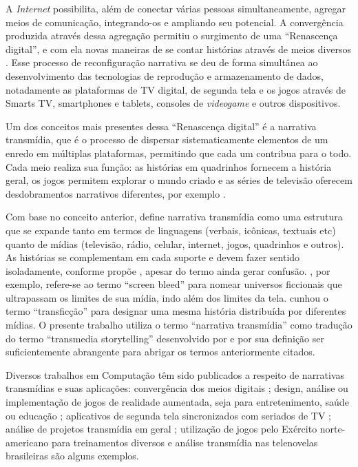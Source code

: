 \documentclass[
article,			%
11pt,				%
oneside,			%
a4paper,			%
english,			%
brazil,				%
sumario=tradicional
]{abntex2}
\begin{document}
  A \textit{Internet} possibilita, além de conectar várias pessoas simultaneamente, agregar meios de comunicação, integrando-os e ampliando seu potencial. A convergência produzida através dessa agregação permitiu o surgimento de uma ``Renascença digital'', e com ela novas maneiras de se contar histórias através de meios diversos \cite{jenkins_2001}. Esse processo de reconfiguração narrativa se deu de forma simultânea ao desenvolvimento das tecnologias de reprodução e armazenamento de dados, notadamente as plataformas de TV digital, de segunda tela e os jogos através de Smarts TV, smartphones e tablets, consoles de \textit{videogame} e outros dispositivos.

  Um dos conceitos mais presentes dessa ``Renascença digital'' é a narrativa transmídia, que é o processo de dispersar sistematicamente elementos de um enredo em múltiplas plataformas, permitindo que cada um contribua para o todo. Cada meio realiza sua função: as histórias em quadrinhos fornecem a história geral, os jogos permitem explorar o mundo criado e as séries de televisão oferecem desdobramentos narrativos diferentes, por exemplo \cite{jenkins_fastcompany_2011}.

  Com base no conceito anterior,  define narrativa transmídia como uma estrutura que se expande tanto em termos de linguagens (verbais, icônicas, textuais etc) quanto de mídias (televisão, rádio, celular, internet, jogos, quadrinhos e outros). As histórias se complementam em cada suporte e devem fazer sentido isoladamente, conforme propõe , apesar do termo ainda gerar confusão. , por exemplo, refere-se ao termo ``screen bleed'' para nomear universos ficcionais que ultrapassam os limites de sua mídia, indo além dos limites da tela.  cunhou o termo ``transficção''  para  designar  uma  mesma  história  distribuída  por  diferentes  mídias. O presente trabalho utiliza o termo ``narrativa transmídia'' como tradução do termo ``transmedia storytelling'' desenvolvido por  e por sua definição ser suficientemente abrangente para abrigar os termos anteriormente citados.

  Diversos trabalhos em Computação têm sido publicados a respeito de narrativas transmídias e suas aplicações: convergência dos meios digitais \cite{murray_2012}; design, análise ou implementação de jogos de realidade aumentada, seja para entretenimento, saúde ou educação \cite{bonsignore_2012,evans_2014,johnston_2012,holler_2014}; aplicativos de segunda tela sincronizados com seriados de TV \cite{nandakumar_2014}; análise de projetos transmídia em geral \cite{amy_2014}; utilização de jogos pelo Exército norte-americano para treinamentos diversos \cite{raybourn_2014} e análise transmídia nas telenovelas brasileiras \cite{murakami_2015} são alguns exemplos.
\end{document}
